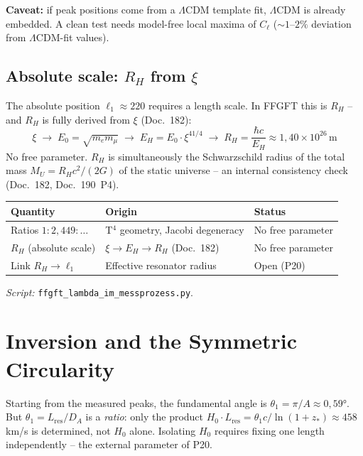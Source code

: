 \textbf{Caveat:} if peak positions come from a $\Lambda$CDM template
fit, $\Lambda$CDM is already embedded. A clean test needs model-free
local maxima of $C_\ell$ ($\sim 1$--$2\%$ deviation from
$\Lambda$CDM-fit values).

\subsection*{Absolute scale: $R_H$ from $\xi$}

The absolute position $\ell_1 \approx 220$ requires a length scale.
In FFGFT this is $R_H$ -- and $R_H$ is fully derived from $\xi$
(Doc.~182):
\[
  \xi \;\to\; E_0 = \sqrt{m_e m_\mu} \;\to\;
  E_H = E_0 \cdot \xi^{41/4} \;\to\;
  R_H = \frac{\hbar c}{E_H} \approx 1{,}40 \times 10^{26}\,\text{m}
\]
No free parameter. $R_H$ is simultaneously the Schwarzschild radius
of the total mass $M_U = R_H c^2/(2G)$ of the static universe --
an internal consistency check (Doc.~182, Doc.~190~P4).

\begin{center}
\begin{tabular}{p{3.5cm}p{4.5cm}p{3cm}}
\toprule
\textbf{Quantity} & \textbf{Origin} & \textbf{Status} \\
\midrule
Ratios $1:2{,}449:\ldots$ &
  T$^4$ geometry, Jacobi degeneracy &
  No free parameter \\
\addlinespace
$R_H$ (absolute scale) &
  $\xi \to E_H \to R_H$ (Doc.~182) &
  No free parameter \\
\addlinespace
Link $R_H \to \ell_1$ &
  Effective resonator radius &
  Open (P20) \\
\bottomrule
\end{tabular}
\end{center}

\emph{Script:} \texttt{ffgft\_lambda\_im\_messprozess.py}.

\section{Inversion and the Symmetric Circularity}

Starting from the measured peaks, the fundamental angle is
$\theta_1 = \pi/A \approx 0{,}59°$. But $\theta_1 = L_\mathrm{res}/D_A$ is a
\emph{ratio}: only the product $H_0 \cdot L_\mathrm{res} = \theta_1 c/\ln(1+z_*)
\approx 458$ km/s is determined, not $H_0$ alone. Isolating $H_0$ requires
fixing one length independently -- the external parameter of P20.

